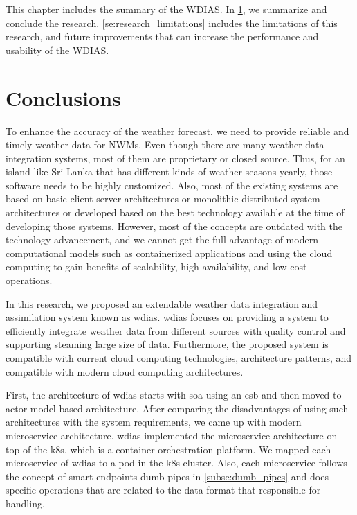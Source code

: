 This chapter includes the summary of the WDIAS. In \cref{se:summary_conclusion}, we summarize and conclude the research. \cref{se:research_limitations} includes the limitations of this research, and future improvements that can increase the performance and usability of the WDIAS.

\section{Conclusions}
\label{se:summary_conclusion}

To enhance the accuracy of the weather forecast, we need to provide reliable and timely weather data for NWMs. Even though there are many weather data integration systems, most of them are proprietary or closed source. Thus, for an island like Sri Lanka that has different kinds of weather seasons yearly, those software needs to be highly customized. Also, most of the existing systems are based on basic client-server architectures or monolithic distributed system architectures or developed based on the best technology available at the time of developing those systems. However, most of the concepts are outdated with the technology advancement, and we cannot get the full advantage of modern computational models such as containerized applications and using the cloud computing to gain benefits of scalability, high availability, and low-cost operations.

In this research, we proposed an extendable weather data integration and assimilation system known as \acrfull{wdias}. \acrshort{wdias} focuses on providing a system to efficiently integrate weather data from different sources with quality control and supporting steaming large size of data. Furthermore, the proposed system is compatible with current cloud computing technologies, architecture patterns, and compatible with modern cloud computing architectures.

First, the architecture of \acrshort{wdias} starts with \acrshort{soa} using an \acrfull{esb} and then moved to actor model-based architecture. After comparing the disadvantages of using such architectures with the system requirements, we came up with modern microservice architecture. \acrshort{wdias} implemented the microservice architecture on top of the \acrshort{k8s}, which is a container orchestration platform. We mapped each microservice of \acrshort{wdias} to a pod in the \acrshort{k8s} cluster. Also, each microservice follows the concept of smart endpoints dumb pipes in \cref{subse:dumb_pipes} and does specific operations that are related to the data format that responsible for handling.


